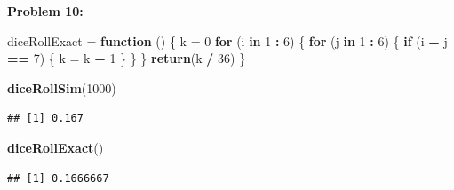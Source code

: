 \documentclass[11pt]{article}
\newenvironment{problem}[1]{\textbf{Problem #1:}}{\newpage}
\newenvironment{Shaded}{\begin{snugshade}}{\end{snugshade}}
\newcommand{\ControlFlowTok}[1]{\textcolor[rgb]{0.13,0.29,0.53}{\textbf{#1}}}
\newcommand{\DecValTok}[1]{\textcolor[rgb]{0.00,0.00,0.81}{#1}}
\newcommand{\KeywordTok}[1]{\textcolor[rgb]{0.13,0.29,0.53}{\textbf{#1}}}
\newcommand{\NormalTok}[1]{#1}
\newcommand{\OperatorTok}[1]{\textcolor[rgb]{0.81,0.36,0.00}{\textbf{#1}}}
\newcommand{\StringTok}[1]{\textcolor[rgb]{0.31,0.60,0.02}{#1}}
\begin{document}
\begin{problem}{10}
\begin{Shaded}
\begin{Highlighting}[]
\NormalTok{diceRollExact =}\StringTok{ }\ControlFlowTok{function}\NormalTok{ () \{}
\NormalTok{  k =}\StringTok{ }\DecValTok{0}
  \ControlFlowTok{for}\NormalTok{ (i }\ControlFlowTok{in} \DecValTok{1} \OperatorTok{:}\StringTok{ }\DecValTok{6}\NormalTok{) \{}
    \ControlFlowTok{for}\NormalTok{ (j }\ControlFlowTok{in} \DecValTok{1} \OperatorTok{:}\StringTok{ }\DecValTok{6}\NormalTok{) \{}
      \ControlFlowTok{if}\NormalTok{ (i }\OperatorTok{+}\StringTok{ }\NormalTok{j }\OperatorTok{==}\StringTok{ }\DecValTok{7}\NormalTok{) \{}
\NormalTok{        k =}\StringTok{ }\NormalTok{k }\OperatorTok{+}\StringTok{ }\DecValTok{1}
\NormalTok{      \}}
\NormalTok{    \}}
\NormalTok{  \}}
  \KeywordTok{return}\NormalTok{(k }\OperatorTok{/}\StringTok{ }\DecValTok{36}\NormalTok{)}
\NormalTok{\}}
\end{Highlighting}
\end{Shaded}
\begin{Shaded}
\begin{Highlighting}[]
\KeywordTok{diceRollSim}\NormalTok{(}\DecValTok{1000}\NormalTok{)}
\end{Highlighting}
\end{Shaded}

\begin{verbatim}
## [1] 0.167
\end{verbatim}

\begin{Shaded}
\begin{Highlighting}[]
\KeywordTok{diceRollExact}\NormalTok{()}
\end{Highlighting}
\end{Shaded}

\begin{verbatim}
## [1] 0.1666667
\end{verbatim}

	\end{problem}
\end{document}
